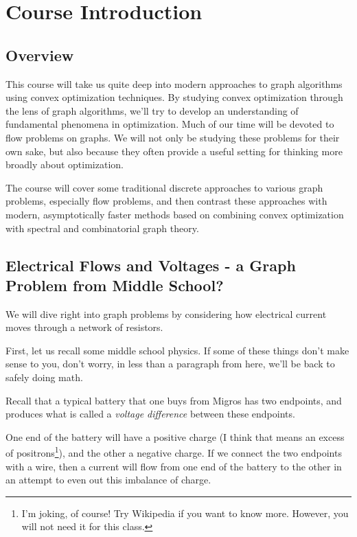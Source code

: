 \chapter{Course Introduction}
\label{cha:intro}

\sloppy

\section{Overview}
 This course will take us quite deep into modern approaches to
 graph algorithms using convex optimization techniques.
%
 By studying convex optimization through the lens of graph algorithms,
 we'll try to develop an understanding of fundamental
 phenomena in optimization.
 Much of our time will be devoted to flow problems on graphs.
 We will not only be studying these problems for their own sake,
 but also because they often provide a useful setting for thinking more broadly about optimization.

 The course will cover some traditional discrete approaches to various graph
 problems, especially flow problems, and then contrast these approaches
 with modern, asymptotically faster methods based on combining convex
 optimization with spectral and combinatorial graph theory.

\section{Electrical Flows and Voltages - a Graph Problem from Middle School?}

We will dive right into graph problems by considering how electrical
current moves through a network of resistors.

First, let us recall some middle school physics.
If some of these things don't make sense to you, don't worry, in less
than a paragraph from here, we'll be back to safely doing math.

Recall that a typical battery that one buys from Migros has two
endpoints, and produces what is called a \emph{voltage
  difference} between these endpoints.

One end of the battery will have a positive charge (I think that means an excess of
positrons\footnote{I'm joking, of course! Try Wikipedia if you want to know
more. However, you will not need it for this class.}), and the other a
negative charge.
If we connect the two endpoints with a wire, then a current will flow
from one end of the battery to the other in an attempt to even out
this imbalance of charge.

